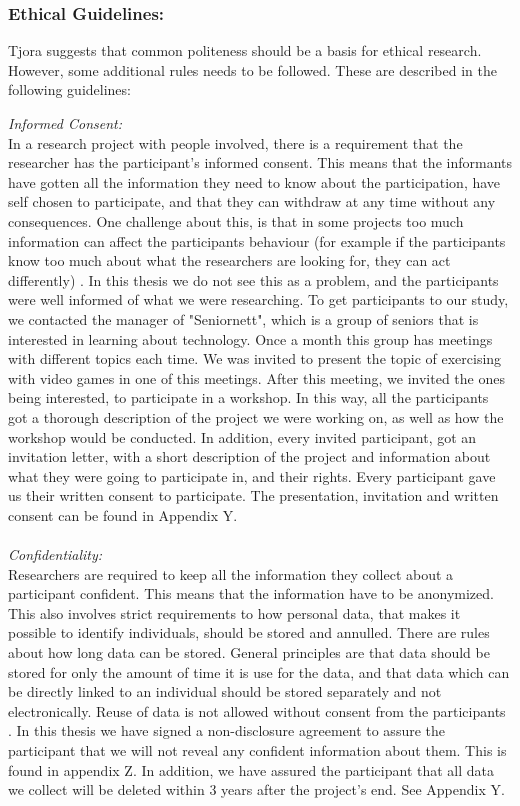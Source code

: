 \subsubsection{Ethical Guidelines:}
Tjora \cite{tjora} suggests that common politeness should be a basis for ethical research. However, some additional rules needs to be followed. These are described in the following guidelines:

\emph{Informed Consent:} \\
In a research project with people involved, there is a requirement that the researcher has the participant's informed consent. This means that the informants have gotten all the information they need to know about the participation, have self chosen to participate, and that they can withdraw at any time without any consequences. One challenge about this, is that in some projects too much information can affect the participants behaviour (for example if the participants know too much about what the researchers are looking for, they can act differently) \cite{qualitative}. In this thesis we do not see this as a problem, and the participants were well informed of what we were researching. To get participants to our study, we contacted the manager of "Seniornett", which is a group of seniors that is interested in learning about technology. Once a month this group has meetings with different topics each time. We was invited to present the topic of exercising with video games in one of this meetings. After this meeting, we invited the ones being interested, to participate in a workshop. In this way, all the participants got a thorough description of the project we were working on, as well as how the workshop would be conducted. In addition, every invited participant, got an invitation letter, with a short description of the project and information about what they were going to participate in, and their rights. Every participant gave us their written consent to participate. The presentation, invitation and written consent can be found in Appendix Y.   \\ \\
\emph{Confidentiality:}\\
Researchers are required to keep all the information they collect about a participant confident. This means that the information have to be anonymized. This also involves strict requirements to how personal data, that makes it possible to identify individuals, should be stored and annulled. There are rules about how long data can be stored. General principles are that data should be stored for only the amount of time it is use for the data, and that data which can be directly linked to an individual should be stored separately and not electronically.  Reuse of data is not allowed without consent from the participants \cite{qualitative}. In this thesis we have signed a non-disclosure agreement to assure the participant that we will not reveal any confident information about them. This is found in appendix Z. In addition, we have assured the participant that all data we collect will be deleted within 3 years after the project's end. See Appendix Y. \\ \\
